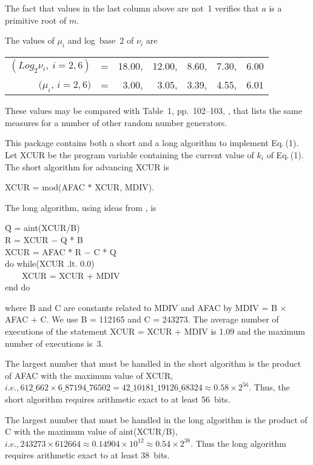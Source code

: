 \documentclass[twoside]{MATH77}
\begin{document}
The fact that values in the last column above are not~1 verifies that $a$ is a
primitive root of $m.$

The values of $\mu _i$ and log~base~2 of $\nu _i$ are

\begin{tabular}{r@{\ }c@{\ }r@{\ \ }r@{\ \ }r@{\ \ }r@{\ \ }r}
$(Log_2 \nu _i,\ i=2,6)$ & = & 18.00, & 12.00, & 8.60, & 7.30, & 6.00\\
$(\mu _i$, $i=2,6)$ &      = &  3.00, &  3.05, & 3.39, & 4.55, & 6.01
\end{tabular}

These values may be compared with Table~1, pp.~102--103,
\cite{Knuth:1981:ACP}, that lists the same measures for a number of other
random number generators.

This package contains both a short and a long algorithm to implement Eq.\,(1).
Let XCUR be the program variable containing the current value of $k_i$ of
Eq.\,(1). The short algorithm for advancing XCUR is

\hspace{.2in}XCUR = mod(AFAC * XCUR, MDIV).

The long algorithm, using ideas from \cite{Wichmann:1982:AEP}, is

\begin{tabbing}
\hspace{.2in}\=Q = aint(XCUR/B)\\
\>R = XCUR $-$ Q * B\\
\>XCUR = AFAC * R $-$ C * Q\\
\>do while(XCUR .lt. 0.0)\\
\>\ \ \ \ XCUR = XCUR + MDIV\\
\>end do
\end{tabbing}

where B and C are constants related to MDIV and AFAC by MDIV = B $\times $
AFAC + C. We use B = 112165 and C = 243273. The average number of executions
of the statement XCUR = XCUR + MDIV is 1.09 and the maximum number of
executions is~3.

The largest number that must be handled in the short algorithm is the
product of AFAC with the maximum value of XCUR, $i.e., 612\_662 \times
6\_87194\_76502 = 42\_10181\_19126\_68324 \approx 0.58 \times 2^{56}$. Thus,
the short algorithm requires arithmetic exact to at least 56~bits.

The largest number that must be handled in the long algorithm is the product
of C with the maximum value of aint(XCUR/B), $i.e., 243273 \times 612664 \approx
0.14904 \times 10^{12} \approx 0.54 \times 2^{38}$. Thus the long algorithm requires
arithmetic exact to at least 38~bits.
\end{document}
